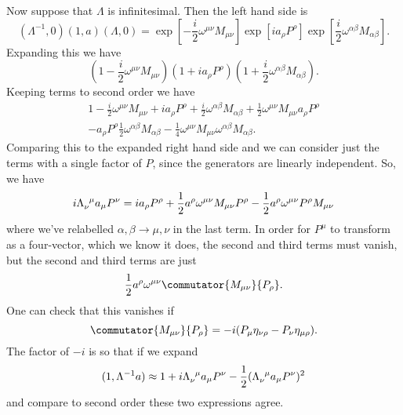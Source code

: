 \documentclass[fleqn]{NotesClass}
\newcommand{\ident}{1}
\newcommand{\minkowskiMetric}{\eta}
\begin{document}
    Now suppose that \(\Lambda\) is infinitesimal.
    Then the left hand side is
    \begin{equation}
        (\Lambda^{-1}, 0)(\ident, a)(\Lambda, 0) = \exp\left[ -\frac{i}{2}\omega^{\mu\nu}M_{\mu\nu} \right]\exp[ia_\rho P^\rho] \exp\left[ \frac{i}{2}\omega^{\alpha\beta}M_{\alpha\beta} \right].
    \end{equation}
    Expanding this we have
    \begin{equation}
        \left( 1 - \frac{i}{2} \omega^{\mu\nu}M_{\mu\nu} \right)(1 + ia_\rho P^\rho)\left( 1 + \frac{i}{2} \omega^{\alpha\beta} M_{\alpha\beta} \right).
    \end{equation}
    Keeping terms to second order we have
    \begin{multline}
        1 - \frac{i}{2}\omega^{\mu\nu}M_{\mu\nu} + ia_\rho P^\rho + \frac{i}{2}\omega^{\alpha\beta}M_{\alpha\beta} + \frac{1}{2}\omega^{\mu\nu}M_{\mu\nu} a_\rho P^\rho\\
        - a_\rho P^\rho \frac{1}{2}\omega^{\alpha\beta}M_{\alpha\beta} - \frac{1}{4} \omega^{\mu\nu}M_{\mu\nu}\omega^{\alpha\beta}M_{\alpha\beta}.
    \end{multline}
    Comparing this to the expanded right hand side and we can consider just the terms with a single factor of \(P\), since the generators are linearly independent.
    So, we have
    \begin{equation}
        i\tensor{\Lambda}{_\nu^\mu} a_\mu P^\nu = ia_\rho P^\rho + \frac{1}{2} a^\rho\omega^{\mu\nu} M_{\mu\nu} P^\rho - \frac{1}{2} a^\rho \omega^{\mu\nu} P^\rho M_{\mu\nu}
    \end{equation}
    where we've relabelled \(\alpha, \beta \to \mu, \nu\) in the last term.
    In order for \(P^\mu\) to transform as a four-vector, which we know it does, the second and third terms must vanish, but the second and third terms are just
    \begin{equation}
        \frac{1}{2}a^\rho \omega^{\mu\nu} \commutator{M_{\mu\nu}}{P_\rho}.
    \end{equation}
    One can check that this vanishes if
    \begin{equation}
        \commutator{M_{\mu\nu}}{P_\rho} = -i(P_\mu \minkowskiMetric_{\nu\rho} - P_\nu \minkowskiMetric_{\mu\rho}).
    \end{equation}
    The factor of \(-i\) is so that if we expand
    \begin{equation}
        (1, \Lambda^{-1}a) \approx 1 + i\tensor{\Lambda}{_\nu^\mu}a_\mu P^\nu - \frac{1}{2}(\tensor{\Lambda}{_\nu^\mu}a_\mu P^\nu)^2
    \end{equation}
    and compare to second order these two expressions agree.
    
\end{document}
